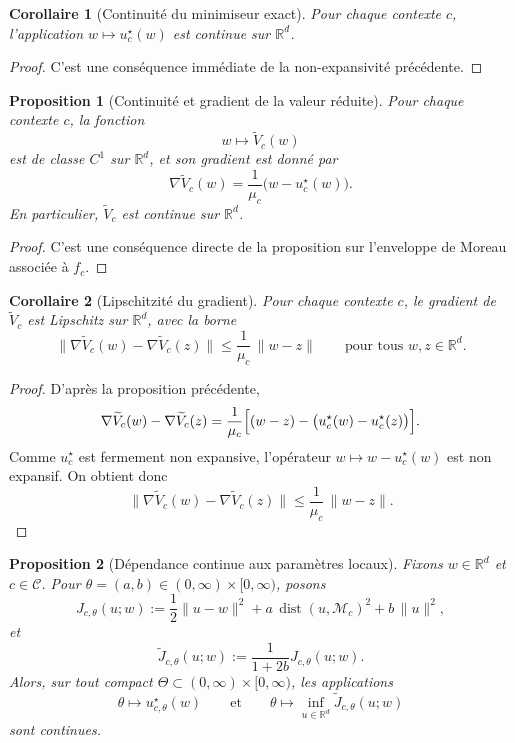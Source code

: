 \documentclass[11pt,a4paper]{article}
\newtheorem{proposition}{Proposition}[section]
\newtheorem{corollary}{Corollaire}[section]
\DeclareMathOperator{\dist}{dist}
\newcommand{\R}{\mathbb R}
\newcommand{\Mcal}{\mathcal M}
\newcommand{\Ccal}{\mathcal C}
\begin{document}
\begin{corollary}[Continuité du minimiseur exact]
Pour chaque contexte \(c\), l'application \(w\mapsto u_c^\star(w)\) est continue sur \(\R^d\).
\end{corollary}

\begin{proof}
C'est une conséquence immédiate de la non-expansivité précédente.
\end{proof}

\begin{proposition}[Continuité et gradient de la valeur réduite]
Pour chaque contexte \(c\), la fonction
\[
w\longmapsto \widetilde V_c(w)
\]
est de classe \(C^1\) sur \(\R^d\), et son gradient est donné par
\[
\nabla \widetilde V_c(w)
=
\frac{1}{\mu_c}\bigl(w-u_c^\star(w)\bigr).
\]
En particulier, \(\widetilde V_c\) est continue sur \(\R^d\).
\end{proposition}

\begin{proof}
C'est une conséquence directe de la proposition sur l'enveloppe de Moreau associée à \(f_c\).
\end{proof}

\begin{corollary}[Lipschitzité du gradient]
Pour chaque contexte \(c\), le gradient de \(\widetilde V_c\) est Lipschitz sur \(\R^d\), avec la borne
\[
\|\nabla \widetilde V_c(w)-\nabla \widetilde V_c(z)\|
\le
\frac{1}{\mu_c}\,\|w-z\|
\qquad
\text{pour tous } w,z\in\R^d.
\]
\end{corollary}

\begin{proof}
D'après la proposition précédente,
\[
\nabla \widetilde V_c(w)-\nabla \widetilde V_c(z)
=
\frac{1}{\mu_c}\Bigl[(w-z)-\bigl(u_c^\star(w)-u_c^\star(z)\bigr)\Bigr].
\]
Comme \(u_c^\star\) est fermement non expansive, l'opérateur \(w\mapsto w-u_c^\star(w)\) est non expansif. On obtient donc
\[
\|\nabla \widetilde V_c(w)-\nabla \widetilde V_c(z)\|
\le
\frac{1}{\mu_c}\,\|w-z\|.
\]
\end{proof}

\begin{proposition}[Dépendance continue aux paramètres locaux]
Fixons \(w\in\R^d\) et \(c\in\Ccal\). Pour \(\theta=(a,b)\in(0,\infty)\times[0,\infty)\), posons
\[
J_{c,\theta}(u;w)
:=
\frac12\|u-w\|^2+a\,\dist(u,\Mcal_c)^2+b\,\|u\|^2,
\]
et
\[
\widetilde J_{c,\theta}(u;w):=\frac{1}{1+2b}J_{c,\theta}(u;w).
\]
Alors, sur tout compact \(\Theta\subset(0,\infty)\times[0,\infty)\), les applications
\[
\theta\longmapsto u_{c,\theta}^\star(w)
\qquad\text{et}\qquad
\theta\longmapsto \inf_{u\in\R^d}\widetilde J_{c,\theta}(u;w)
\]
sont continues.
\end{proposition}
\end{document}
